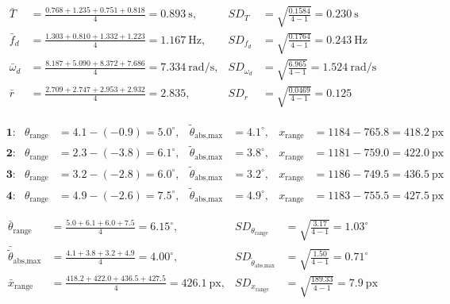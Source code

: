 \documentclass[11pt,a4paper]{article}
\begin{document}
\begin{align*}
\bar{T} &= \frac{0.768+1.235+0.751+0.818}{4} = 0.893~\text{s}, &
SD_{T} &= \sqrt{\frac{0.1584}{4-1}} = 0.230~\text{s} \\
\bar{f}_d &= \frac{1.303+0.810+1.332+1.223}{4} = 1.167~\text{Hz}, &
SD_{f_d} &= \sqrt{\frac{0.1764}{4-1}} = 0.243~\text{Hz} \\
\bar{\omega}_d &= \frac{8.187+5.090+8.372+7.686}{4} = 7.334~\text{rad/s}, &
SD_{\omega_d} &= \sqrt{\frac{6.965}{4-1}} = 1.524~\text{rad/s} \\
\bar{r} &= \frac{2.709+2.747+2.953+2.932}{4} = 2.835, &
SD_{r} &= \sqrt{\frac{0.0469}{4-1}} = 0.125
\end{align*}

\par

\begin{align*}
&\textbf{1:} & \theta_\text{range} &= 4.1-(-0.9) = 5.0^\circ, & \tilde{\theta}_\text{abs,max} &= 4.1^\circ, & x_\text{range} &= 1184-765.8 = 418.2~\text{px} \\
&\textbf{2:} & \theta_\text{range} &= 2.3-(-3.8) = 6.1^\circ, & \tilde{\theta}_\text{abs,max} &= 3.8^\circ, & x_\text{range} &= 1181-759.0 = 422.0~\text{px} \\
&\textbf{3:} & \theta_\text{range} &= 3.2-(-2.8) = 6.0^\circ, & \tilde{\theta}_\text{abs,max} &= 3.2^\circ, & x_\text{range} &= 1186-749.5 = 436.5~\text{px} \\
&\textbf{4:} & \theta_\text{range} &= 4.9-(-2.6) = 7.5^\circ, & \tilde{\theta}_\text{abs,max} &= 4.9^\circ, & x_\text{range} &= 1183-755.5 = 427.5~\text{px}
\end{align*}

\begin{align*}
\bar{\theta}_\text{range} &= \frac{5.0+6.1+6.0+7.5}{4} = 6.15^\circ, &
SD_{\theta_\text{range}} &= \sqrt{\frac{3.17}{4-1}} = 1.03^\circ \\
\bar{\tilde{\theta}}_\text{abs,max} &= \frac{4.1+3.8+3.2+4.9}{4} = 4.00^\circ, &
SD_{\tilde{\theta}_\text{abs,max}} &= \sqrt{\frac{1.50}{4-1}} = 0.71^\circ \\
\bar{x}_\text{range} &= \frac{418.2+422.0+436.5+427.5}{4} = 426.1~\text{px}, &
SD_{x_\text{range}} &= \sqrt{\frac{189.33}{4-1}} = 7.9~\text{px}
\end{align*}
\end{document}
